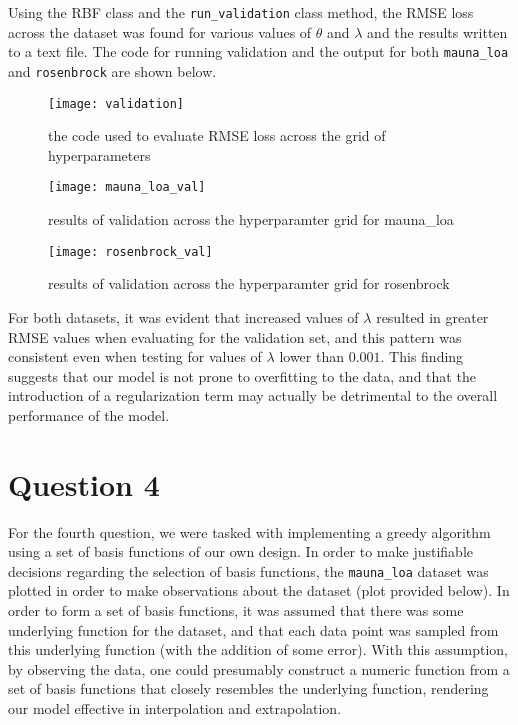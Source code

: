 \documentclass{article}
\begin{document}
Using the RBF class and the \verb+run_validation+ class method, the RMSE loss across the dataset was found for various values of $\theta$ and $\lambda$ and the results written to a text file. The code for running validation and the output for both \verb+mauna_loa+ and \verb+rosenbrock+ are shown below.

\begin{figure}[H]
\centering
\texttt{[image: validation]}
\caption{the code used to evaluate RMSE loss across the grid of hyperparameters}
\end{figure}

\begin{figure}[H]
\centering
\texttt{[image: mauna\_loa\_val]}
\caption{results of validation across the hyperparamter grid for mauna\_loa}
\end{figure}

\begin{figure}[H]
\centering
\texttt{[image: rosenbrock\_val]}
\caption{results of validation across the hyperparamter grid for rosenbrock}
\end{figure}

For both datasets, it was evident that increased values of $\lambda$ resulted in greater RMSE values when evaluating for the validation set, and this pattern was consistent even when testing for values of $\lambda$ lower than $0.001$. This finding suggests that our model is not prone to overfitting to the data, and that the introduction of a regularization term may actually be detrimental to the overall performance of the model.

\pagebreak
\fi
\section*{Question 4}
For the fourth question, we were tasked with implementing a greedy algorithm using a set of basis functions of our own design. In order to make justifiable decisions regarding the selection of basis functions, the \verb+mauna_loa+ dataset was plotted in order to make observations about the dataset (plot provided below). In order to form a set of basis functions, it was assumed that there was some underlying function for the dataset, and that each data point was sampled from this underlying function (with the addition of some error). With this assumption, by observing the data, one could presumably construct a numeric function from a set of basis functions that closely resembles the underlying function, rendering our model effective in interpolation and extrapolation.
\end{document}
